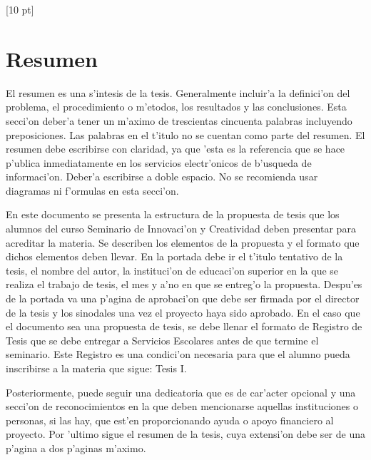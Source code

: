 \titleformat{\chapter}{\Huge\bfseries}{\thechapter}{0 pt}{\rule{340 pt}{3 pt}\\}
\titlespacing{\chapter}{100 pt}{-25 pt}{40 pt}[10 pt]	
\pagestyle{fancy}
\fancyhead[RO,RE]{\thepage}
\fancyfoot[CO,CE]{}

\chapter*{Resumen}


\normalsize
\noindent El resumen es una s'intesis de la tesis. Generalmente incluir'a la definici'on del problema, el procedimiento o m'etodos, los resultados y las conclusiones. Esta secci'on deber'a tener un m'aximo de trescientas cincuenta palabras incluyendo preposiciones. Las palabras en el t'itulo no se cuentan como parte del resumen. El resumen debe escribirse con claridad, ya que 'esta es la referencia que se hace p'ublica inmediatamente en los servicios electr'onicos de b'usqueda de informaci'on. Deber'a escribirse a doble espacio. No se recomienda usar diagramas ni f'ormulas en esta secci'on.

En este documento se presenta la estructura de la propuesta de tesis que los alumnos del curso Seminario de Innovaci'on y Creatividad deben presentar para acreditar la materia. Se describen los elementos de la propuesta y el formato que dichos elementos deben llevar. En la portada debe ir el t'itulo tentativo de la tesis, el nombre del autor, la instituci'on de educaci'on superior en la que se realiza el trabajo de tesis, el mes y a'no en que se entreg'o la propuesta. Despu'es de la portada va una p'agina de aprobaci'on que debe ser firmada por el director de la tesis y los sinodales una vez el proyecto haya sido aprobado. En el caso que el documento sea una propuesta de tesis, se debe llenar el formato de Registro de Tesis que se debe entregar a Servicios Escolares antes de que termine el seminario. Este Registro es una condici'on necesaria para que el alumno pueda inscribirse a la materia que sigue: Tesis I.

Posteriormente, puede seguir una dedicatoria que es de car'acter opcional y una secci'on de reconocimientos en la que deben mencionarse aquellas instituciones o personas, si las hay, que est'en proporcionando ayuda o apoyo financiero al proyecto. Por 'ultimo sigue el resumen de la tesis, cuya extensi'on debe ser de una p'agina a dos p'aginas m'aximo.

